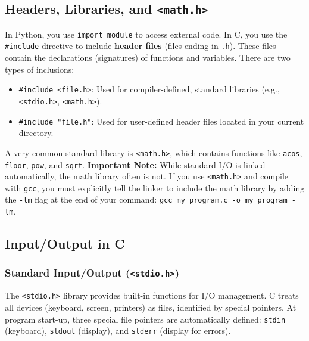 \subsection{Headers, Libraries, and \texttt{<math.h>}}

In Python, you use \texttt{import module} to access external code. In C, you use the \texttt{\#include} directive to include \textbf{header files} (files ending in \texttt{.h}). These files contain the declarations (signatures) of functions and variables. There are two types of inclusions:
\begin{itemize}
    \item[-] \texttt{\#include <file.h>}: Used for compiler-defined, standard libraries (e.g., \texttt{<stdio.h>}, \texttt{<math.h>}).
    \item[-] \texttt{\#include "file.h"}: Used for user-defined header files located in your current directory.
\end{itemize}

A very common standard library is \texttt{<math.h>}, which contains functions like \texttt{acos}, \texttt{floor}, \texttt{pow}, and \texttt{sqrt}. 
\textbf{Important Note:} While standard I/O is linked automatically, the math library often is not. If you use \texttt{<math.h>} and compile with \texttt{gcc}, you must explicitly tell the linker to include the math library by adding the \texttt{-lm} flag at the end of your command: \texttt{gcc my\_program.c -o my\_program -lm}.



\subsection{Input/Output in C}

\subsubsection{Standard Input/Output (\texttt{<stdio.h>})}

The \texttt{<stdio.h>} library provides built-in functions for I/O management. C treats all devices (keyboard, screen, printers) as files, identified by special pointers. At program start-up, three special file pointers are automatically defined: \texttt{stdin} (keyboard), \texttt{stdout} (display), and \texttt{stderr} (display for errors).

